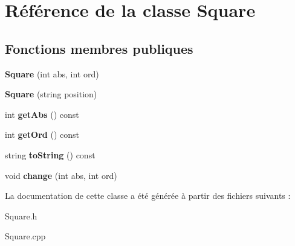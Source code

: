\hypertarget{classSquare}{}\section{Référence de la classe Square}
\label{classSquare}
\subsection*{Fonctions membres publiques}
\begin{DoxyCompactItemize}
\item 
\mbox{\label{classSquare_a5e975f8caefdf170a134060257bc0f0e}} 
{\bfseries Square} (int abs, int ord)
\item 
\mbox{\label{classSquare_a924a4a0638ce85c91fe85979efb50beb}} 
{\bfseries Square} (string position)
\item 
\mbox{\label{classSquare_adba4757480b750bf13761f24121ae4f9}} 
int {\bfseries get\+Abs} () const
\item 
\mbox{\label{classSquare_a567e282d31a4bacd0137c783f082704e}} 
int {\bfseries get\+Ord} () const
\item 
\mbox{\label{classSquare_ac96b26bcf6ece7878ef9fcf92b8dadbb}} 
string {\bfseries to\+String} () const
\item 
\mbox{\label{classSquare_a034d916fcc0f55f3bed1e3268c802b77}} 
void {\bfseries change} (int abs, int ord)
\end{DoxyCompactItemize}


La documentation de cette classe a été générée à partir des fichiers suivants \+:\begin{DoxyCompactItemize}
\item 
Square.\+h\item 
Square.\+cpp\end{DoxyCompactItemize}
